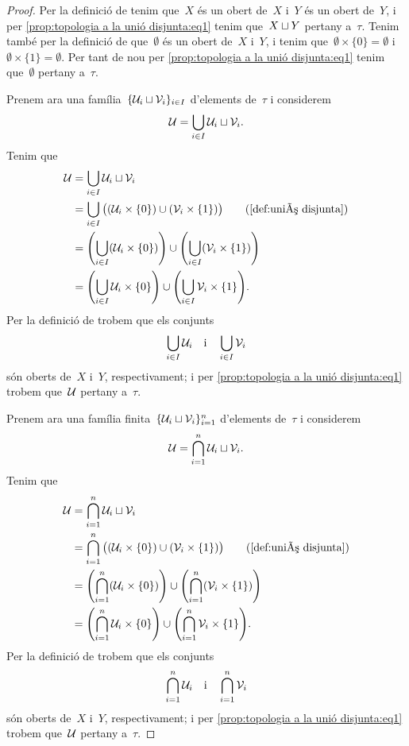 \documentclass[../../main.tex]{subfiles}
\begin{document}
    \begin{proof}
        Per la definició de  tenim que~\(X\) és un obert de~\(X\) i~\(Y\) és un obert de~\(Y\), i per \eqref{prop:topologia a la unió disjunta:eq1} tenim que~\(X\mathbin{\sqcup} Y\) pertany a~\(\tau\).
        Tenim també per la definició de  que~\(\emptyset\) és un obert de~\(X\) i~\(Y\), i tenim que~\(\emptyset\times\{0\}=\emptyset\) i~\(\emptyset\times\{1\}=\emptyset\).
        Per tant de nou per \eqref{prop:topologia a la unió disjunta:eq1} tenim que~\(\emptyset\) pertany a~\(\tau\).

        Prenem ara una família~\(\{\mathcal{U}_{i}\mathbin{\sqcup}\mathcal{V}_{i}\}_{i\in I}\) d'elements de~\(\tau\) i considerem
        \[
            \mathcal{U}=\bigcup_{i\in I}\mathcal{U}_{i}\mathbin{\sqcup}\mathcal{V}_{i}.
        \]
        Tenim que
        \begin{align*}
            \obert{U}&=\bigcup_{i\in I}\obert{U}_{i}\uniodisjunta\obert{V}_{i} \\
            &=\bigcup_{i\in I}\big((\obert{U}_{i}\times\{0\})\cup(\obert{V}_{i}\times\{1\})\big) \tag{\ref{def:unió disjunta}} \\
            &=\left(\bigcup_{i\in I}(\obert{U}_{i}\times\{0\})\right)\cup\left(\bigcup_{i\in I}(\obert{V}_{i}\times\{1\})\right) \\
            &=\left(\bigcup_{i\in I}\obert{U}_{i}\times\{0\}\right)\cup\left(\bigcup_{i\in I}\obert{V}_{i}\times\{1\}\right).
        \end{align*}
        Per la definició de  trobem que els conjunts
        \[
            \bigcup_{i\in I}\mathcal{U}_{i}\quad\text{i}\quad\bigcup_{i\in I}\mathcal{V}_{i}
        \]
        són oberts de~\(X\) i~\(Y\), respectivament; i per \eqref{prop:topologia a la unió disjunta:eq1} trobem que~\(\mathcal{U}\) pertany a~\(\tau\).

        Prenem ara una família finita~\(\{\mathcal{U}_{i}\mathbin{\sqcup}\mathcal{V}_{i}\}_{i=1}^{n}\) d'elements de~\(\tau\) i considerem
        \[
            \mathcal{U}=\bigcap_{i=1}^{n}\mathcal{U}_{i}\mathbin{\sqcup}\mathcal{V}_{i}.
        \]
        Tenim que
        \begin{align*}
            \obert{U}&=\bigcap_{i=1}^{n}\obert{U}_{i}\uniodisjunta\obert{V}_{i} \\
            &=\bigcap_{i=1}^{n}\big((\obert{U}_{i}\times\{0\})\cup(\obert{V}_{i}\times\{1\})\big) \tag{\ref{def:unió disjunta}} \\
            &=\left(\bigcap_{i=1}^{n}(\obert{U}_{i}\times\{0\})\right)\cup\left(\bigcap_{i=1}^{n}(\obert{V}_{i}\times\{1\})\right) \\
            &=\left(\bigcap_{i=1}^{n}\obert{U}_{i}\times\{0\}\right)\cup\left(\bigcap_{i=1}^{n}\obert{V}_{i}\times\{1\}\right).
        \end{align*}
        Per la definició de  trobem que els conjunts
        \[
            \bigcap_{i=1}^{n}\mathcal{U}_{i}\quad\text{i}\quad\bigcap_{i=1}^{n}\mathcal{V}_{i}
        \]
        són oberts de~\(X\) i~\(Y\), respectivament; i per \eqref{prop:topologia a la unió disjunta:eq1} trobem que~\(\mathcal{U}\) pertany a~\(\tau\).


\end{proof}
\end{document}
